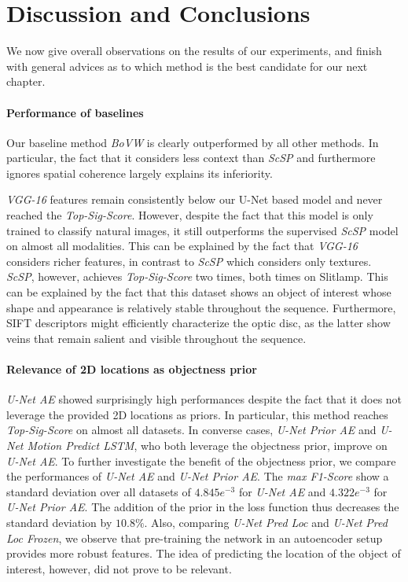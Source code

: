 \chapter{Discussion and Conclusions}

We now give overall observations on the results of our experiments, and finish with general advices
as to which method is the best candidate for our next chapter.

\subsubsection{Performance of baselines}
Our baseline method \textit{BoVW} is clearly outperformed by all other methods.
In particular, the fact that it considers less context than \textit{ScSP} and furthermore ignores spatial coherence largely explains its inferiority.

\textit{VGG-16} features remain consistently below our U-Net based model and never reached the \textit{Top-Sig-Score}.
However, despite the fact that this model is only trained to classify natural images, it still outperforms the supervised \textit{ScSP} model on almost all modalities.
This can be explained by the fact that \textit{VGG-16} considers richer features, in contrast to \textit{ScSP} which considers only textures.
\textit{ScSP}, however, achieves \textit{Top-Sig-Score} two times, both times on Slitlamp.
This can be explained by the fact that this dataset shows an object of interest whose shape and appearance is relatively stable throughout the sequence.
Furthermore, SIFT descriptors might efficiently characterize the optic disc, as the latter show veins that remain salient and visible throughout the sequence.

\subsubsection{Relevance of 2D locations as objectness prior}
\textit{U-Net AE} showed surprisingly high performances despite the fact that it does not leverage the provided 2D locations as priors.
In particular, this method reaches \textit{Top-Sig-Score} on almost all datasets.
In converse cases, \textit{U-Net Prior AE} and \textit{U-Net Motion Predict LSTM}, who both leverage the objectness prior, improve on \textit{U-Net AE}.
To further investigate the benefit of the objectness prior, we compare the performances of \textit{U-Net AE} and \textit{U-Net Prior AE}.
The \textit{max F1-Score} show a standard deviation over all datasets of $4.845e^{-3}$ for \textit{U-Net AE} and $4.322e^{-3}$ for \textit{U-Net Prior AE}.
The addition of the prior in the loss function thus decreases the standard deviation by $10.8\%$.
Also, comparing \textit{U-Net Pred Loc} and \textit{U-Net Pred Loc Frozen}, we observe that pre-training the network in an autoencoder setup provides more robust features.
The idea of predicting the location of the object of interest, however, did not prove to be relevant.

